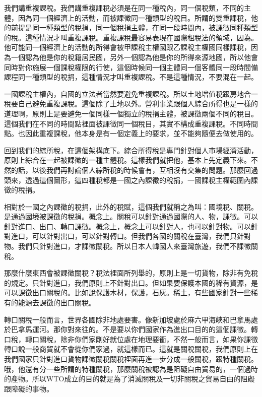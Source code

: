 \documentclass[oneside,sub3section]{ctexbook}
\begin{document}
我們講重複課稅。我們講重複課稅必須是在同一種稅內，同一個稅類，不同的主體，因為同一個經濟上的活動，而被課徵同一種類型的稅目。所謂的雙重課稅，他的前提是同一種類型的稅捐，同一個稅捐主體，在同一段時間內，被課徵同種類型的稅。這種情況才叫重複課稅。重複課稅最容易表現在國際租稅法的領域，因為。他可能同一個經濟上的活動的所得會被甲課稅主權國跟乙課稅主權國同樣課稅，因為一個認為他是你的稅籍居民國，另外一個認為他是你的所得來源地國，所以他會同時對你施展一個課稅權限的行使，這個時候同一個主體同一個客體同一段時間備課程同一種類型的稅捐，這種情況才叫重複課稅。不是這種情況，不要混在一起。

一國課稅主權內，自國的立法者當然要避免重複課稅。所以土地增值稅跟房地合一稅要自己避免重複課稅。這個除了土地以外。營利事業跟個人綜合所得也是一樣的道理啊，原則上是要避免一個同樣一個獨立的稅捐主體，被課徵兩個不同的稅目。這個我們在不同的時間點裡面被課徵同一個稅目，其實不構成重複課稅。不同時間點。也因此重複課稅，他本身是有一個定義上的要求，並不能夠隨便去做使用的。

回到我們的綜所稅，在這個架構底下。綜合所得稅是專門針對個人市場經濟活動，原則上綜合在一起被課徵的一種主體稅。這樣我們就把他，基本上先定義下來。不然的話，以後我們再討論個人綜所稅的時候會有，互相沒有交集的問題。那麼回過頭來，透過這個圖形，這四種稅都是一國之內課徵的稅捐，一國課稅主權範圍內課徵的稅捐。

相對於一國之內課徵的稅捐，此外的稅賦，這個我們就稱之為叫：國境稅、關稅。是通過國境被課徵的稅捐。概念上。關稅可以針對通過國際的人、物，課徵。可以針對進口、出口、轉口課徵。概念上，概念上可以針對人，也可以針對物。可以針對進口，可以針對出口，可以針對轉口。但我們各國的關稅在臺灣，我們只針對物。我們只針對進口，才課徵關稅。所以日本人韓國人來臺灣旅遊，我們不課徵關稅。

那麼什麼東西會被課徵關稅？稅法裡面所列舉的，原則上是一切貨物，除非有免稅的規定。只針對進口，我們原則上不針對出口。但如果要保護本國的稀有資源，是可以課徵出口關稅的。比如說保護木材，保護，石灰。稀土，有些國家針對一些稀有的能源去課徵的出口關稅。

轉口關稅一般而言，世界各國除非地處要害。像新加坡處於麻六甲海峽和巴拿馬處於巴拿馬運河。那你對來往的。不是要以你們國家作為進出口目的的這個課徵。轉口稅，轉口關稅，除非你們家剛好就位處在地理要衝，不然一般而言，如果你課徵轉口說一般商貿就不會從你們家過，就這樣而已。這就是關稅關稅，我們原則上在我們國家只針對進口貨物課徵關稅關稅裡面再進一步分成一般關稅，跟特種關稅。哦，他還有分一些所謂的特種關稅，那麼關稅被認為是阻礙自由貿易的，一個過時的產物。所以WTO成立的目的就是為了消滅關稅及一切非關稅之貿易自由的阻礙跟障礙的事物。
\end{document}
